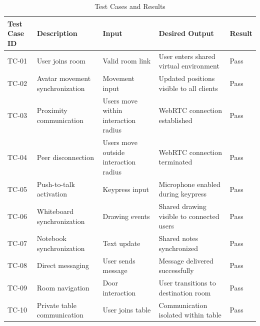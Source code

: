 \documentclass[12pt]{article}
\begin{document}
\begin{table}[h!]
\centering
\renewcommand{\arraystretch}{1.5}

\begin{tabular}{|p{2cm}|p{4cm}|p{3cm}|p{4cm}|p{2cm}|}
\hline
\textbf{Test Case ID} & \textbf{Description} & \textbf{Input} & \textbf{Desired Output} & \textbf{Result} \\ 
\hline

TC-01 & User joins room & Valid room link & User enters shared virtual environment & Pass \\ 
\hline

TC-02 & Avatar movement synchronization & Movement input & Updated positions visible to all clients & Pass \\ 
\hline

TC-03 & Proximity communication & Users move within interaction radius & WebRTC connection established & Pass \\ 
\hline

TC-04 & Peer disconnection & Users move outside interaction radius & WebRTC connection terminated & Pass \\ 
\hline

TC-05 & Push-to-talk activation & Keypress input & Microphone enabled during keypress & Pass \\ 
\hline

TC-06 & Whiteboard synchronization & Drawing events & Shared drawing visible to connected users & Pass \\ 
\hline

TC-07 & Notebook synchronization & Text update & Shared notes synchronized & Pass \\ 
\hline

TC-08 & Direct messaging & User sends message & Message delivered successfully & Pass \\ 
\hline

TC-09 & Room navigation & Door interaction & User transitions to destination room & Pass \\ 
\hline

TC-10 & Private table communication & User joins table & Communication isolated within table & Pass \\ 
\hline

\end{tabular}
\caption{Test Cases and Results}

\end{table}
\end{document}
